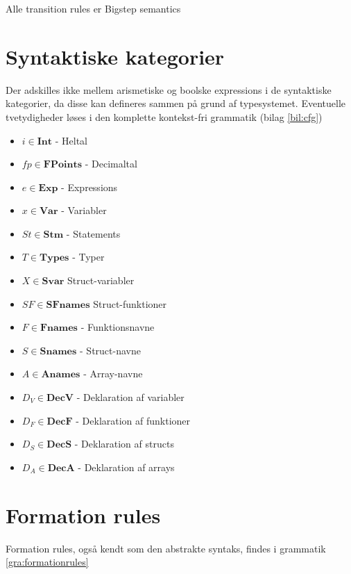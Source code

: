 \renewcommand{\syntleft}{\normalfont\itshape}
\renewcommand{\syntright}{$$}

Alle transition rules er Bigstep semantics

\tocless \section{Syntaktiske kategorier}

Der adskilles ikke mellem arismetiske og boolske expressions i de syntaktiske kategorier, da disse kan defineres sammen på grund af typesystemet. Eventuelle tvetydigheder løses i den komplette kontekst-fri grammatik (bilag \ref{bil:cfg})

\begin{itemize}
    \item $ i \in \textbf{Int} $ - Heltal
    \item $ fp \in \textbf{FPoints} $ - Decimaltal
    \item $ e \in \textbf{Exp} $ - Expressions
    \item $ x \in \textbf{Var} $ - Variabler
    \item $ St \in \textbf{Stm} $ - Statements
    \item $ T \in \textbf{Types} $ - Typer
    \item $ X \in \textbf{Svar} $ Struct-variabler
    \item $ SF \in \textbf{SFnames} $ Struct-funktioner
    \item $ F \in \textbf{Fnames} $ - Funktionsnavne
    \item $ S \in \textbf{Snames} $ - Struct-navne
    \item $ A \in \textbf{Anames} $ - Array-navne
    \item $ D_V \in \textbf{DecV} $ - Deklaration af variabler
    \item $ D_F \in \textbf{DecF} $ - Deklaration af funktioner
    \item $ D_S \in \textbf{DecS} $ - Deklaration af structs
    \item $ D_A \in \textbf{DecA} $ - Deklaration af arrays
\end{itemize}
\pagebreak

\tocless \section{Formation rules}
\noindent Formation rules, også kendt som den abstrakte syntaks, findes i grammatik \ref{gra:formationrules}

